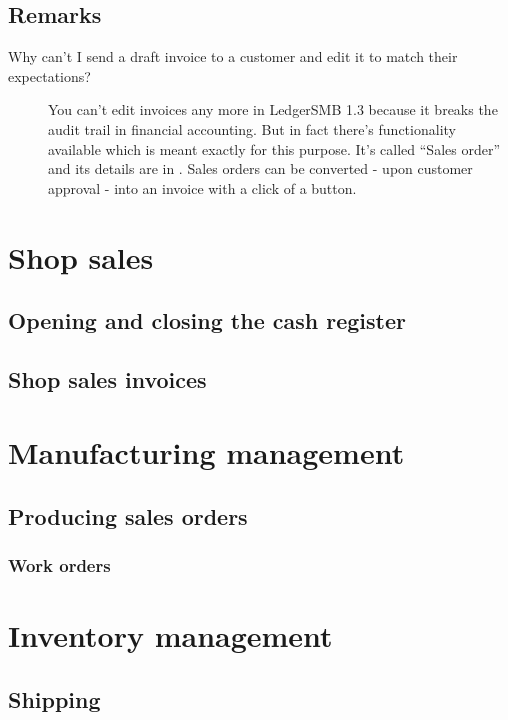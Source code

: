 \section{Remarks}

\begin{description}
\item [Why can't I send a draft invoice to a customer and edit it
   to match their expectations?] 
You can't edit invoices any more in LedgerSMB 1.3 because it breaks the audit trail
in financial accounting. But in fact there's functionality available which is meant
exactly for this purpose. It's called ``Sales order'' and its details are in
. Sales orders can be converted - upon customer approval -
into an invoice with a click of a button.
\end{description}


\chapter{Shop sales}

\section{Opening and closing the cash register}

\section{Shop sales invoices}


\chapter{Manufacturing management}

\section{Producing sales orders}

\subsection{Work orders}


\chapter{Inventory management}

\section{Shipping}

